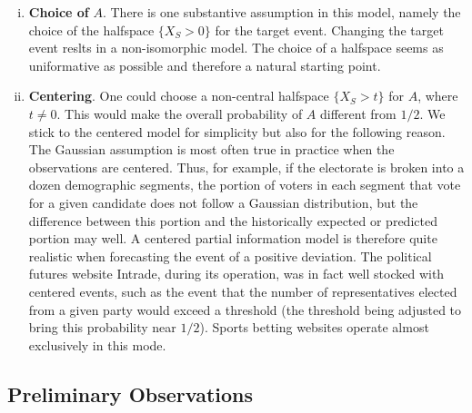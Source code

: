 \documentclass[11pt]{article}
\theoremstyle{definition}
\theoremstyle{definition}
\begin{document}
\begin{enumerate}[(i)]
\item {\bf Choice of} $A$.  There is one substantive assumption 
in this model, namely the choice of the halfspace $\{ X_S > 0 \}$ 
for the target event.  Changing the target event reslts in a 
non-isomorphic model.  The choice of a halfspace seems as 
uniformative as possible and therefore a natural starting point.
\item {\bf Centering}. One could choose a non-central halfspace 
$\{ X_S > t \}$ for $A$, where $t \neq 0$.  This would make the 
overall probability of $A$ different from $1/2$.  We stick to the 
centered model for simplicity but also for the following reason.  
The Gaussian assumption is most often true in practice when the 
observations are centered.  Thus, for example, if the electorate 
is broken into a dozen demographic segments, the portion of voters 
in each segment that vote for a given candidate does not follow a 
Gaussian distribution, but the difference between this portion and 
the historically expected or predicted portion may well.  A centered 
partial information model is therefore quite realistic when forecasting 
the event of a positive deviation.  The political futures website Intrade, 
during its operation, was in fact well stocked with centered events, 
such as the event that the number of representatives elected from 
a given party would exceed a threshold (the threshold being adjusted 
to bring this probability near $1/2$).  Sports betting websites operate 
almost exclusively in this mode.
\label{item:centered}
\end{enumerate}

\subsection{Preliminary Observations}
\end{document}
